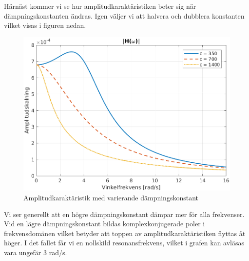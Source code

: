 \newpage
Härnäst kommer vi se hur amplitudkaraktäristiken beter sig när dämpningskonstanten ändras. Igen väljer vi att halvera och dubblera konstanten vilket visas i figuren nedan.  
\begin{figure}[H]
    \centering
    \includegraphics[scale=0.9]{bilder/amplitudkaraktaristik_variation_c}
    \caption{Amplitudkaraktäristik med varierande dämpningskonstant}
    \label{fig:amplitudkaraktaristik_variation_c}
\end{figure}
Vi ser generellt att en högre dämpningskonstant dämpar mer för alla frekvenser. Vid en lägre dämpningskonstant bildas komplexkonjugerade poler i frekvensdomänen vilket betyder att toppen av amplitudkaraktäristiken flyttas åt höger. I det fallet får vi en nollskild resonansfrekvens, vilket i grafen kan avläsas vara ungefär $3$ rad/s. 

\newpage
